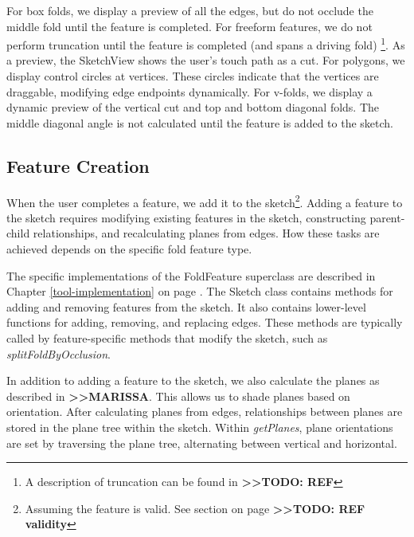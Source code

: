 For box folds, we display a preview of all the edges, but do not occlude
the middle fold until the feature is completed. For freeform features,
we do not perform truncation until the feature is completed (and spans a
driving fold) \footnote{A description of truncation can be found in
  \textbf{\textgreater{}\textgreater{}TODO: REF}}. As a preview, the
SketchView shows the user's touch path as a cut. For polygons, we
display control circles at vertices. These circles indicate that the
vertices are draggable, modifying edge endpoints dynamically. For
v-folds, we display a dynamic preview of the vertical cut and top and
bottom diagonal folds. The middle diagonal angle is not calculated until
the feature is added to the sketch.

\subsection{Feature Creation}\label{feature-creation}

When the user completes a feature, we add it to the sketch\footnote{Assuming
  the feature is valid. See section on page
  \textbf{\textgreater{}\textgreater{}TODO: REF validity}}. Adding a
feature to the sketch requires modifying existing features in the
sketch, constructing parent-child relationships, and recalculating
planes from edges. How these tasks are achieved depends on the specific
fold feature type.

The specific implementations of the FoldFeature superclass are described
in Chapter \ref{tool-implementation} on page
\pageref{tool-implementation}. The Sketch class contains methods for
adding and removing features from the sketch. It also contains
lower-level functions for adding, removing, and replacing edges. These
methods are typically called by feature-specific methods that modify the
sketch, such as \emph{splitFoldByOcclusion}.

In addition to adding a feature to the sketch, we also calculate the
planes as described in \textbf{\textgreater{}\textgreater{}MARISSA}.
This allows us to shade planes based on orientation. After calculating
planes from edges, relationships between planes are stored in the plane
tree within the sketch. Within \emph{getPlanes}, plane orientations are
set by traversing the plane tree, alternating between vertical and
horizontal.
